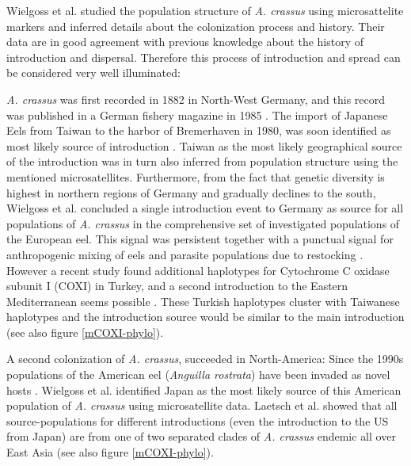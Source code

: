 Wielgoss et al. \cite{wielgoss_population_2008} studied the population
structure of \textit{A. crassus} using microsattelite markers and
inferred details about the colonization process and history. Their
data are in good agreement with previous knowledge about the history
of introduction and dispersal. Therefore this process of introduction
and spread can be considered very well illuminated:


\textit{A. crassus} was first recorded in 1882 in North-West Germany,
and this record was published in a German fishery magazine in 1985
\cite{fischer_teichwirt}. The import of Japanese Eels from Taiwan to
the harbor of Bremerhaven in 1980, was soon identified as most likely
source of introduction
\cite{koops_anguillicola-infestations_1989}. Taiwan as the most likely
geographical source of the introduction was in turn also inferred from
population structure using the mentioned microsatellites. Furthermore,
from the fact that genetic diversity is highest in northern regions of
Germany and gradually declines to the south, Wielgoss et al.
concluded a single introduction event to Germany as source for all
populations of \textit{A. crassus} in the comprehensive set of
investigated populations of the European eel. This signal was
persistent together with a punctual signal for anthropogenic mixing of
eels and parasite populations due to restocking
\cite{pmid20646147}. However a recent study found additional
haplotypes for Cytochrome C oxidase subunit I (COXI) in Turkey, and a
second introduction to the Eastern Mediterranean seems possible
\cite{dl_py}. These Turkish haplotypes cluster with Taiwanese
haplotypes and the introduction source would be similar to the main
introduction (see also figure \ref{mCOXI-phylo}).

A second colonization of \textit{A. crassus}, succeeded in
North-America: Since the 1990s populations of the American eel
(\textit{Anguilla rostrata}) have been invaded as novel hosts
\cite{fries_notes:_1996,barse_exotic_1999,
  barse_swimbladder_2001}. Wielgoss et al. identified Japan as the
most likely source of this American population of \textit{A. crassus}
using microsatellite data. Laetsch et al. \cite{dl_py} showed that all
source-populations for different introductions (even the introduction
to the US from Japan) are from one of two separated clades of
\textit{A. crassus} endemic all over East Asia (see also figure
\ref{mCOXI-phylo}).

